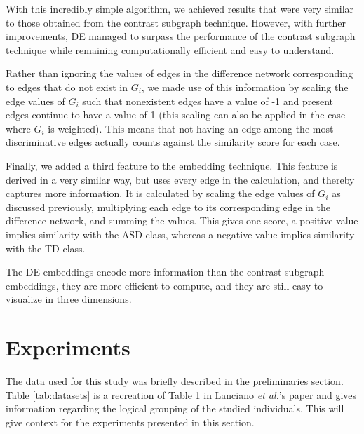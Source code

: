 \documentclass[sigconf]{acmart}
\begin{document}
With this incredibly simple algorithm, we achieved results that were very similar to those obtained from the contrast subgraph technique.
However, with further improvements, DE managed to surpass the performance of the contrast subgraph technique while remaining computationally efficient and easy to understand.

Rather than ignoring the values of edges in the difference network corresponding to edges that do not exist in $G_i$, we made use of this information by scaling the edge values of $G_i$ such that nonexistent edges have a value of -1 and present edges continue to have a value of 1 (this scaling can also be applied in the case where $G_i$ is weighted).
This means that not having an edge among the most discriminative edges actually counts against the similarity score for each case.

Finally, we added a third feature to the embedding technique.
This feature is derived in a very similar way, but uses every edge in the calculation, and thereby captures more information.
It is calculated by scaling the edge values of $G_i$ as discussed previously, multiplying each edge to its corresponding edge in the difference network, and summing the values.
This gives one score, a positive value implies similarity with the ASD class, whereas a negative value implies similarity with the TD class.

The DE embeddings encode more information than the contrast subgraph embeddings, they are more efficient to compute, and they are still easy to visualize in three dimensions.



\section{Experiments}

The data used for this study was briefly described in the preliminaries section.
Table \ref{tab:datasets} is a recreation of Table 1 in Lanciano \emph{et al.}'s paper and gives information regarding the logical grouping of the studied individuals.
This will give context for the experiments presented in this section.
\end{document}
